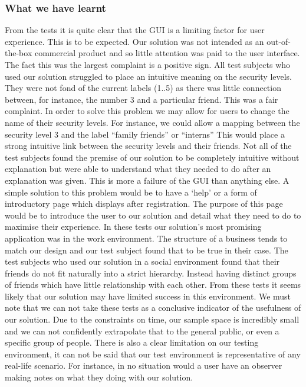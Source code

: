 \documentclass[12pt, titlepage]{article}
\begin{document}
\subsubsection{What we have learnt}
From the tests it is quite clear that the GUI is a limiting factor for user experience. This is to be expected. Our solution was not intended as an out-of-the-box commercial product and so little attention was paid to the user interface. The fact this was the largest complaint is a positive sign.
\newline \indent All test subjects who used our solution struggled to place an intuitive meaning on the security levels. They were not fond of the current labels (1..5) as there was little connection between, for instance, the number 3 and a particular friend. This was a fair complaint. In order to solve this problem we may allow for users to change the name of their security levels. For instance, we could allow a mapping between the security level 3 and the label ``family friends'' or ``interns'' This would place a strong intuitive link between the security levels and their friends.
\newline \indent Not all of the test subjects found the premise of our solution to be completely intuitive without explanation but were able to understand what they needed to do after an explanation was given. This is more a failure of the GUI than anything else. A simple solution to this problem would be to have a `help' or a form of introductory page which displays after registration. The purpose of this page would be to introduce the user to our solution and detail what they need to do to maximise their experience. 
\newline \indent In these tests our solution's most promising application was in the work environment. The structure of a business tends to match our design and our test subject found that to be true in their case. The test subjects who used our solution in a social environment found that their friends do not fit naturally into a strict hierarchy. Instead having distinct groups of friends which have little relationship with each other. From these tests it seems likely that our solution may have limited success in this environment.
\newline \indent We must note that we can not take these tests as a conclusive indicator of the usefulness of our solution. Due to the constraints on time, our sample space is incredibly small and we can not confidently extrapolate that to the general public, or even a specific group of people. There is also a clear limitation on our testing environment, it can not be said that our test environment is representative of any real-life scenario. For instance, in no situation would a user have an observer making notes on what they doing with our solution.
\end{document}
